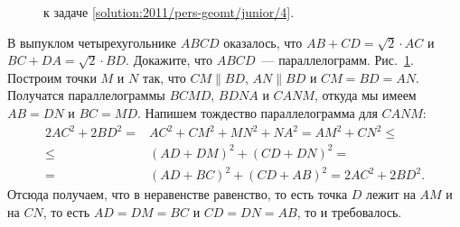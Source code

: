 \ifsolution
\begin{figure}\centering
    \caption{к задаче \ref{solution:2011/pers-geomt/junior/4}.}
    \label{fig:solution:2011/pers-geomt/junior/4}
\end{figure}
\fi %

\problem
В выпуклом четырехугольнике $ABCD$ оказалось, что
$AB + CD = \sqrt{2} \cdot AC$
и
$BC + DA = \sqrt{2} \cdot BD$.
Докажите, что $ABCD$~--- параллелограмм.
\solution
\label{solution:2011/pers-geomt/junior/4}%
Рис.~\ref{fig:solution:2011/pers-geomt/junior/4}.
Построим точки $M$ и $N$ так, что
$CM \parallel BD$, $AN \parallel BD$ и $CM = BD = AN$.
Получатся параллелограммы $BCMD$, $BDNA$ и $CANM$, откуда мы
имеем $AB = DN$ и $BC = MD$.
Напишем тождество параллелограмма для $CANM$:
\begin{align*}
    2 AC^2 + 2 BD^2
={}&
    AC^2 + CM^2 + MN^2 + NA^2
=
    AM^2 + CN^2
\leq\\\leq{}&
    (AD + DM)^2 + (CD + DN)^2
=\\={}&
    (AD + BC)^2 + (CD + AB)^2
=
    2 AC^2 + 2 BD^2
.\end{align*}
Отсюда получаем, что в неравенстве равенство, то есть точка $D$ лежит на
$AM$ и на $CN$, то есть $AD = DM = BC$ и $CD = DN = AB$, то и требовалось.
\endproblem
